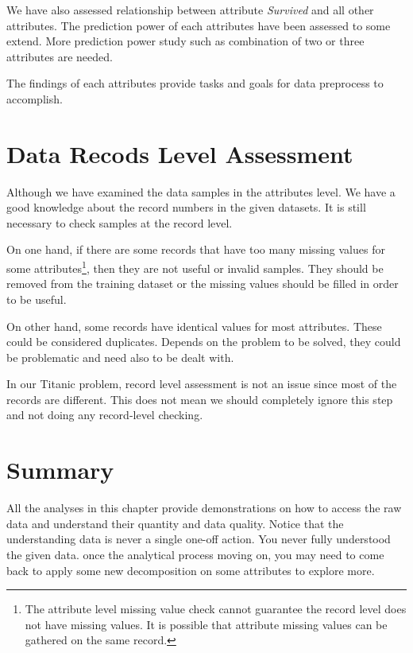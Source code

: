 \documentclass[
]{book}
\begin{document}
We have also assessed relationship between attribute \emph{Survived} and all other attributes. The prediction power of each attributes have been assessed to some extend. More prediction power study such as combination of two or three attributes are needed.

The findings of each attributes provide tasks and goals for data preprocess to accomplish.

\hypertarget{data-recods-level-assessment}{%
\section{Data Recods Level Assessment}\label{data-recods-level-assessment}}

Although we have examined the data samples in the attributes level. We have a good knowledge about the record numbers in the given datasets. It is still necessary to check samples at the record level.

On one hand, if there are some records that have too many missing values for some attributes\footnote{The attribute level missing value check cannot guarantee the record level does not have missing values. It is possible that attribute missing values can be gathered on the same record.}, then they are not useful or invalid samples. They should be removed from the training dataset or the missing values should be filled in order to be useful.

On other hand, some records have identical values for most attributes. These could be considered duplicates. Depends on the problem to be solved, they could be problematic and need also to be dealt with.

In our Titanic problem, record level assessment is not an issue since most of the records are different. This does not mean we should completely ignore this step and not doing any record-level checking.

\hypertarget{summary-2}{%
\section*{Summary}\label{summary-2}}


All the analyses in this chapter provide demonstrations on how to access the raw data and understand their quantity and data quality. Notice that the understanding data is never a single one-off action. You never fully understood the given data. once the analytical process moving on, you may need to come back to apply some new decomposition on some attributes to explore more.
\end{document}

